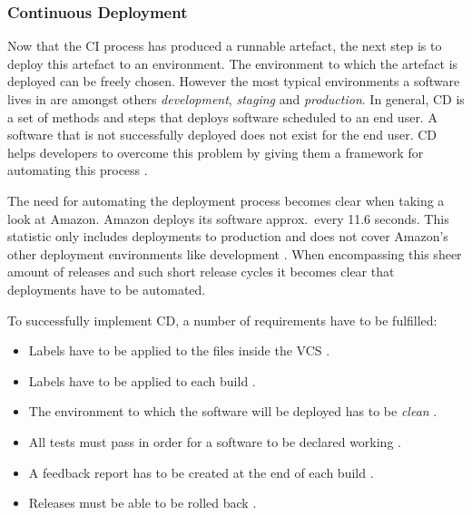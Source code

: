 \subsubsection{Continuous Deployment}%
\label{ssub:Continuous_Deployment}
Now that the \ac{CI} process has produced a runnable artefact, the next step is
to deploy this artefact to an environment. The environment to which the
artefact is deployed can be freely chosen. However the most typical
environments a software lives in are amongst others \textit{development},
\textit{staging} and \textit{production}. In general, \ac{CD} is a set of
methods and steps that deploys software scheduled to an end user. A software
that is not successfully deployed does not exist for the end user. \ac{CD}
helps developers to overcome this problem by giving them a framework for
automating this process \autocite[pp.  190]{MatyasContinuousIntegration2007}.

The need for automating the deployment process becomes clear when taking a look
at Amazon. Amazon deploys its software approx.\ every 11.6 seconds. This
statistic only includes deployments to production and does not cover Amazon's
other deployment environments like development
\autocite{JenkinsVelocityCulture2011}. When encompassing this sheer amount of
releases and such short release cycles it becomes clear that deployments have
to be automated.

To successfully implement \ac{CD}, a number of requirements have to be
fulfilled:
\begin{itemize}
  \item Labels have to be applied to the files inside the \ac{VCS}
    \autocite[pp. 191-194]{MatyasContinuousIntegration2007}.
  \item Labels have to be applied to each build \autocite[pp.
    195f.]{MatyasContinuousIntegration2007}.
  \item The environment to which the software will be deployed has to be
    \textit{clean} \autocite[pp. 194f.]{MatyasContinuousIntegration2007}.
  \item All tests must pass in order for a software to be declared working
    \autocite[p. 196]{MatyasContinuousIntegration2007}.
  \item A feedback report has to be created at the end of each build
    \autocite[pp. 196-198]{MatyasContinuousIntegration2007}.
  \item Releases must be able to be rolled back \autocite[p.
    199]{MatyasContinuousIntegration2007}.
\end{itemize}

